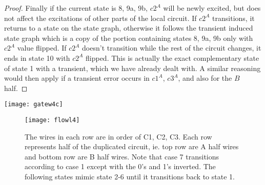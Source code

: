 \documentclass{article}
\begin{document}
\begin{proof}
Finally if the current state is 8, 9a, 9b, $c2^A$ will be newly excited, but does not affect the excitations of other parts of the local circuit.  If $c2^A$ transitions, it returns to a state on the state graph, otherwise it follows the transient induced state graph which is a copy of the portion containing states 8, 9a, 9b only with $c2^A$ value flipped.  If $c2^A$ doesn't transition while the rest of the circuit changes, it ends in state 10 with $c2^A$ flipped.  This is actually the exact complementary state of state 1 with a transient, which we have already dealt with.
A similar reasoning would then apply if a transient error occurs in $c1^A$, $c3^A$, and also for the $B$ half.  
\end{proof}

\texttt{[image: gatew4c]}\newline
\begin{figure}
  \centering
    \texttt{[image: flowl4]}
  \caption{The wires in each row are in order of C1, C2, C3.  Each row represents half of the duplicated circuit, ie. top row are A half wires and bottom row are B half wires.  Note that case 7 transitions according to case 1 except with the 0's and 1's inverted.  The following states mimic state 2-6 until it transitions back to state 1.}
\end{figure}
\end{document}
